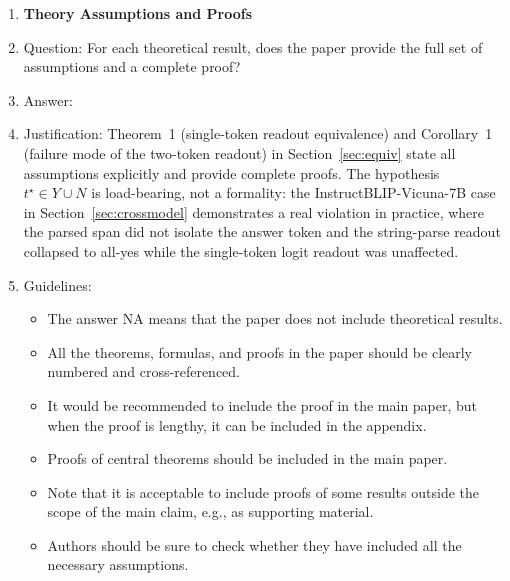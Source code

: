 \begin{enumerate}
\item {\bf Theory Assumptions and Proofs}
\item[] Question: For each theoretical result, does the paper provide the full
set of assumptions and a complete proof?
\item[] Answer: \answerYes{}
\item[] Justification: Theorem~1 (single-token readout equivalence) and
Corollary~1 (failure mode of the two-token readout) in
Section~\ref{sec:equiv} state all assumptions explicitly and provide
complete proofs. The hypothesis $t^\star \in Y \cup N$ is load-bearing, not
a formality: the InstructBLIP-Vicuna-7B case in Section~\ref{sec:crossmodel}
demonstrates a real violation in practice, where the parsed span did not
isolate the answer token and the string-parse readout collapsed to all-yes
while the single-token logit readout was unaffected.
\item[] Guidelines:
\begin{itemize}
    \item The answer NA means that the paper does not include theoretical results.
    \item All the theorems, formulas, and proofs in the paper should be clearly
    numbered and cross-referenced.
    \item It would be recommended to include the proof in the main paper, but
    when the proof is lengthy, it can be included in the appendix.
    \item Proofs of central theorems should be included in the main paper.
    \item Note that it is acceptable to include proofs of some results outside
    the scope of the main claim, e.g., as supporting material.
    \item Authors should be sure to check whether they have included all the
    necessary assumptions.
\end{itemize}


\end{enumerate}
